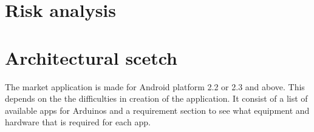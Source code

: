 \section{Risk analysis}

\section{Architectural scetch}
The market application is made for Android platform 2.2 or 2.3 and above. This depends on the the difficulties in creation of the application. It consist of a list of available apps for Arduinos and a requirement section to see what equipment and hardware that is required for each app.